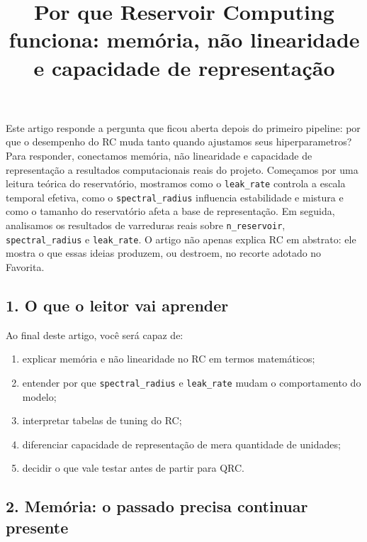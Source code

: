 \documentclass[12pt]{article}
\title{Por que Reservoir Computing funciona: memória, não linearidade e capacidade de representação}
\author{}
\providecommand{\tightlist}{%
          \setlength{\itemsep}{0pt}\setlength{\parskip}{0pt}}
\begin{document}
        \maketitle

        \begin{resumo}
        Este artigo responde a pergunta que ficou aberta depois do primeiro pipeline: por que o desempenho do RC muda tanto quando ajustamos seus hiperparametros? Para responder, conectamos memória, não linearidade e capacidade de representação a resultados computacionais reais do projeto. Começamos por uma leitura teórica do reservatório, mostramos como o \texttt{leak\_rate} controla a escala temporal efetiva, como o \texttt{spectral\_radius} influencia estabilidade e mistura e como o tamanho do reservatório afeta a base de representação. Em seguida, analisamos os resultados de varreduras reais sobre \texttt{n\_reservoir}, \texttt{spectral\_radius} e \texttt{leak\_rate}. O artigo não apenas explica RC em abstrato: ele mostra o que essas ideias produzem, ou destroem, no recorte adotado no Favorita.
        \end{resumo}

        \subsection{1. O que o leitor vai aprender}\label{1-o-que-o-leitor-vai-aprender}

Ao final deste artigo, você será capaz de:

\begin{enumerate}
\def\labelenumi{\arabic{enumi}.}
\tightlist
\item
  explicar memória e não linearidade no RC em termos matemáticos;
\item
  entender por que \texttt{spectral\_radius} e \texttt{leak\_rate} mudam o comportamento do modelo;
\item
  interpretar tabelas de tuning do RC;
\item
  diferenciar capacidade de representação de mera quantidade de unidades;
\item
  decidir o que vale testar antes de partir para QRC.
\end{enumerate}

\subsection{2. Memória: o passado precisa continuar presente}\label{2-memuxf3ria-o-passado-precisa-continuar-presente}
\end{document}
